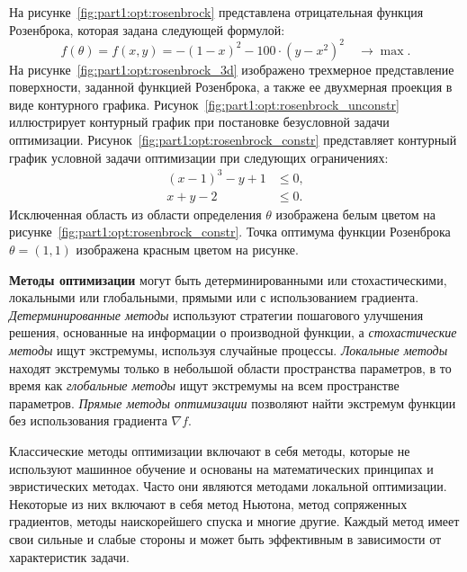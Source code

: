 На рисунке~\ref{fig:part1:opt:rosenbrock} представлена отрицательная функция Розенброка, которая задана следующей формулой:
$$f(\theta) = f(x, y) = - (1-x)^2 - 100\cdot (y-x^2)^2 \quad \to \max.$$
На рисунке~\ref{fig:part1:opt:rosenbrock_3d} изображено трехмерное представление поверхности, заданной функцией Розенброка, а также ее двухмерная проекция в виде контурного графика. Рисунок~\ref{fig:part1:opt:rosenbrock_unconstr} иллюстрирует контурный график при постановке безусловной задачи оптимизации. Рисунок~\ref{fig:part1:opt:rosenbrock_constr} представляет контурный график условной задачи оптимизации при следующих ограничениях:
\begin{align*}
    (x - 1)^3 - y + 1 & \leq 0, \\
    x + y - 2 & \leq 0.
\end{align*}
Исключенная область из области определения $\theta$ изображена белым цветом на рисунке~\ref{fig:part1:opt:rosenbrock_constr}.
Точка оптимума функции Розенброка $\theta = (1, 1)$ изображена красным цветом на рисунке.



\textbf{Методы оптимизации} могут быть детерминированными или стохастическими, локальными или глобальными, прямыми или с использованием градиента.
\emph{Детерминированные методы} используют стратегии пошагового улучшения решения, основанные на информации о производной функции, а \emph{стохастические методы} ищут экстремумы, используя случайные процессы.
\emph{Локальные методы} находят экстремумы только в небольшой области пространства параметров, в то время как \emph{глобальные методы} ищут экстремумы на всем пространстве параметров.
\emph{Прямые методы оптимизации} позволяют найти экстремум функции без использования градиента $\nabla f$. 



Классические методы оптимизации включают в себя методы, которые не используют машинное обучение и основаны на математических принципах и эвристических методах.
Часто они являются методами локальной оптимизации.
Некоторые из них включают в себя метод Ньютона, метод сопряженных градиентов, методы наискорейшего спуска и многие другие.
Каждый метод имеет свои сильные и слабые стороны и может быть эффективным в зависимости от характеристик задачи.

